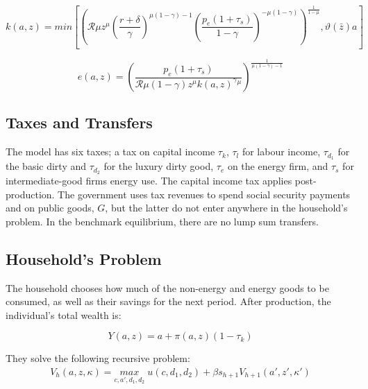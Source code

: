 \documentclass[12pt,a4paper]{article}
\begin{document}
\[k(a,z)=min\left[\left( \mathcal{R}\mu z^{\mu}\left(\frac{r+\delta}{\gamma}\right)^{\mu\left(1-\gamma\right)-1}\left(\frac{p_{e}(1+\tau_{s})}{1-\gamma}\right)^{-\mu(1-\gamma)}\right)^{\frac{1}{1-\mu}},\vartheta(\bar{z})a\right]\]


  
  
\[e(a,z)=\left(\frac{p_{e}(1+\tau_s)}{\mathcal{R}\mu(1-\gamma)z^{\mu}k(a,z)^{\gamma}{}^{\mu}}\right)^{\frac{1}{\mu\left(1-\gamma\right)-1}}\]
  




\subsection{\normalsize Taxes and Transfers}
\hspace*{6mm} The model has six taxes; a tax on capital income $\tau_k$, $\tau_l$ for labour income, $\tau_{d_1}$ for the basic dirty and $\tau_{d_2}$ for the luxury dirty good, $\tau_e$ on the energy firm, and $\tau_s$ for intermediate-good firms energy use. The capital income tax applies post-production. The government uses tax revenues to spend social security payments and on public goods, $G$, but the latter do not enter anywhere in the household's problem. In the benchmark equilibrium, there are no lump sum transfers. 

\subsection{\normalsize Household's Problem}
\hspace*{6mm} The household chooses how much of the non-energy and energy goods to be consumed, as well as their savings for the next period. After production, the individual's total wealth is:

\begin{equation}
 Y(a,z)=a+\pi(a,z)(1-\tau_k) 
\end{equation}
  
  
  They solve the following recursive problem: \[
\begin{array}{ll}
V_h(a,z,\kappa)=
\underset{c, a',d_1,d_2}{max} \; u(c,d_1,d_2)+\beta s_{h+1}V_{h+1}(a',z',\kappa') \\

\end{array}
\]
\end{document}
